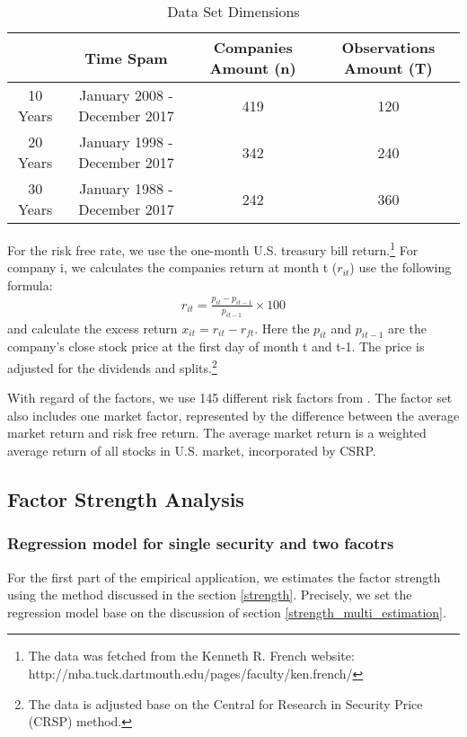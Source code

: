 \begin{table}[h]
		\caption{Data Set Dimensions}
			\label{Data_set}
	\begin{tabular}{c|ccc}
		\hline
		& Time Spam                    & Companies Amount (n) & Observations Amount (T) \\ \hline
		10 Years & January 2008 - December 2017 & 419                  & 120                     \\
		20 Years & January 1998 - December 2017 & 342                  & 240                     \\
		30 Years & January 1988 - December 2017 & 242                  & 360                     \\ \hline
	\end{tabular}
\end{table}
For the risk free rate, we use the one-month U.S. treasury bill return.\footnote{ The data was fetched from the Kenneth R. French website: http://mba.tuck.dartmouth.edu/pages/faculty/ken.french/}
For company i, we calculates the companies return at month t ($r_{it}$) use the following formula:
\begin{align*}
r_{it} = \frac{p_{i t} - p_{i t-1}}{p_{i t-1}}\times 100
\end{align*}
and calculate the excess return $x_{it} = r_{it} - r_{ft}$.
Here the $p_{it}$ and $p_{i t-1}$ are the company's close stock price at the first day of month t and t-1.
The price is adjusted for the dividends and splits.\footnote{The data is adjusted base on the Central for Research in Security Price (CRSP) method.}

With regard of the factors, we use 145 different risk factors from .
The factor set also includes one market factor, represented by the difference between the average market return and risk free return.
The average market return is a weighted average return of all stocks in U.S. market, incorporated by CSRP.

\subsection{Factor Strength Analysis}

\subsubsection{Regression model for single security and two facotrs}
For the first part of the empirical application, we estimates the factor strength using the method discussed in the section \ref{strength}.
Precisely, we set the regression model base on the discussion of section \ref{strength_multi_estimation}.

